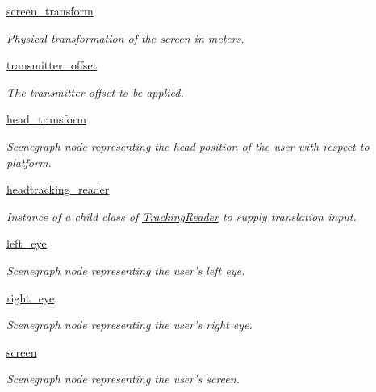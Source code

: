 \begin{DoxyCompactItemize}
\hyperlink{classlib_1_1PowerWallUser_1_1PowerWallUser_a7fed1f9708767b5e394c48c09e526b14}{screen\-\_\-transform}
\begin{DoxyCompactList}\small\item\em \-Physical transformation of the screen in meters. \end{DoxyCompactList}\item 
\hyperlink{classlib_1_1PowerWallUser_1_1PowerWallUser_a55cca8a9685923c2c3b29671fa34fcb7}{transmitter\-\_\-offset}
\begin{DoxyCompactList}\small\item\em \-The transmitter offset to be applied. \end{DoxyCompactList}\item 
\hyperlink{classlib_1_1PowerWallUser_1_1PowerWallUser_a95bf9d86c8dc5d35af9686f88b6fe9a3}{head\-\_\-transform}
\begin{DoxyCompactList}\small\item\em \-Scenegraph node representing the head position of the user with respect to platform. \end{DoxyCompactList}\item 
\hyperlink{classlib_1_1PowerWallUser_1_1PowerWallUser_a61277bfdf2299b5f2421fea86be93fc4}{headtracking\-\_\-reader}
\begin{DoxyCompactList}\small\item\em \-Instance of a child class of \hyperlink{namespacelib_1_1TrackingReader}{\-Tracking\-Reader} to supply translation input. \end{DoxyCompactList}\item 
\hyperlink{classlib_1_1PowerWallUser_1_1PowerWallUser_a7c08b9d36b32814fa14719e2d7494dfd}{left\-\_\-eye}
\begin{DoxyCompactList}\small\item\em \-Scenegraph node representing the user's left eye. \end{DoxyCompactList}\item 
\hyperlink{classlib_1_1PowerWallUser_1_1PowerWallUser_aaaf579efdbc2f052745c40cef0741a0a}{right\-\_\-eye}
\begin{DoxyCompactList}\small\item\em \-Scenegraph node representing the user's right eye. \end{DoxyCompactList}\item 
\hyperlink{classlib_1_1PowerWallUser_1_1PowerWallUser_a3a3aab9cb49cbc130b88626db04b8866}{screen}
\begin{DoxyCompactList}\small\item\em \-Scenegraph node representing the user's screen. \end{DoxyCompactList}\item 

\end{DoxyCompactItemize}
